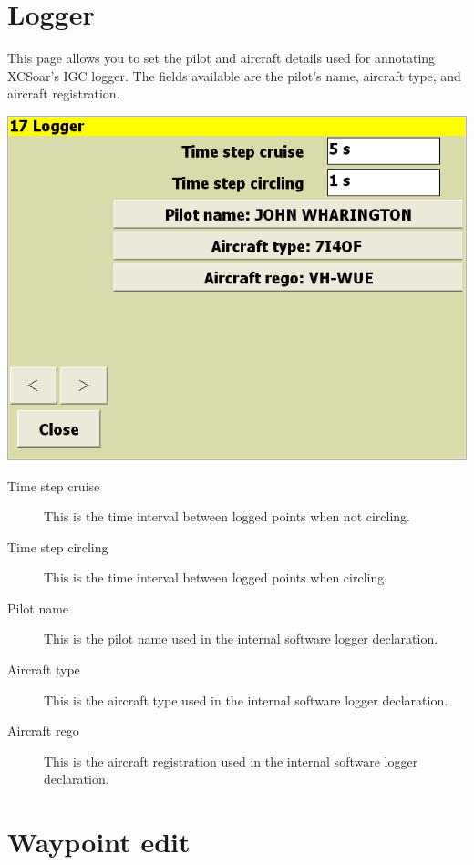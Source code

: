 \documentclass[a4paper,12pt]{refrep}
\begin{document}
\clearpage
\section{Logger}

This page allows you to set the pilot and aircraft details used for
annotating XCSoar's IGC logger.  The fields available are the pilot's
name, aircraft type, and aircraft registration.

\begin{center}
\includegraphics[angle=0,width=\linewidth,keepaspectratio='true']{figures/config-17.png}
\end{center}

\begin{description}
\item[Time step cruise]  This is the time interval between logged points when not circling. 
\item[Time step circling]  This is the time interval between logged points when circling. 
\item[Pilot name]  This is the pilot name used in the internal software logger declaration.
\item[Aircraft type]  This is the aircraft type used in the internal software logger declaration.
\item[Aircraft rego]  This is the aircraft registration used in the internal software logger declaration.
\end{description}

\clearpage
\section{Waypoint edit}
\end{document}

